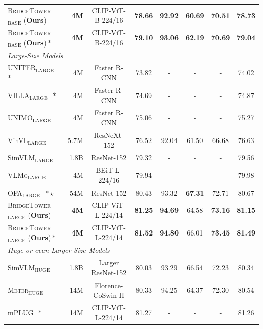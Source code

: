 \documentclass[letterpaper]{article} %
\newcommand{\methodname}[0]{\textsc{BridgeTower}}
\newcommand{\modelbase}[0]{$_{\text{BASE}}$}
\newcommand{\modellarge}[0]{$_{\text{LARGE}}$}
\newcommand{\modelhuge}[0]{$_{\text{HUGE}}$}
\newcommand{\metername}[0]{\textsc{Meter}}
\newcommand{\vlmoname}[0]{\textsc{VLMo}}
\begin{document}
\begin{table}[ht]
{\begin{tabular}{lrc|ccccc}
      \methodname{}\modelbase{} (\textbf{Ours})  & \textbf{4M} & CLIP-ViT-B-224/16 & \textbf{78.66} & \textbf{92.92} & \textbf{60.69} & \textbf{70.51} & \textbf{78.73} \\
      \methodname{}\modelbase{} (\textbf{Ours})\,$\ast$  & \textbf{4M} & CLIP-ViT-B-224/16 & \textbf{79.10} & \textbf{93.06} & \textbf{62.19} & \textbf{70.69} & \textbf{79.04} \\
      \hline
      \multicolumn{7}{l}{ { \it{Large-Size Models} } }\\
      \hline
      UNITER\modellarge{}~\citep{chen2020uniter}\,$\ast$ & 4M & Faster R-CNN & 73.82 & - & - & - & 74.02   \\
      VILLA\modellarge{}~\citep{gan2020large}\,$\ast$ & 4M & Faster R-CNN & 74.69 & - & - & - & 74.87 \\
      UNIMO\modellarge{}~\citep{li2021unimo} & 4M & Faster R-CNN & 75.06 & - & - & - & 75.27  \\
      VinVL\modellarge{}~\citep{zhang2021vinvl} & 5.7M & ResNeXt-152 & {76.52} & 92.04 & 61.50 & 66.68 & 76.63 \\
      {SimVLM\modellarge{}~\citep{wang2021simvlm}} & 1.8B & ResNet-152 & 79.32 & - & - & - & 79.56 \\
      \vlmoname{}\modellarge{}~\citep{wang2021vlmo} & 4M & BEiT-L-224/16 & 79.94 & - & - & - & 79.98 \\
      OFA\modellarge{}~\citep{wang2022OFA}\,$\ast$\,$\star$ & 54M & ResNet-152 & 80.43 & 93.32 & \textbf{67.31} & 72.71 & 80.67 \\
      \methodname{}\modellarge{} (\textbf{Ours})  & \textbf{4M} & CLIP-ViT-L-224/14 & \textbf{81.25}  & \textbf{94.69} & {64.58} & \textbf{73.16} & \textbf{81.15} \\
      \methodname{}\modellarge{} (\textbf{Ours})\,$\ast$  & \textbf{4M} & CLIP-ViT-L-224/14 & \textbf{81.52}  & \textbf{94.80} & {66.01} & \textbf{73.45} & \textbf{81.49} \\
      \hline
    \multicolumn{7}{l}{\it{Huge or even Larger Size Models}}\\
    \hline
      {SimVLM\modelhuge{}~\citep{wang2021simvlm}} & 1.8B & Larger ResNet-152 & {80.03} & 93.29 & 66.54 & 72.23 & {80.34} \\
      \metername{}\modelhuge{}~\citep{dou2021meter} & 14M & Florence-CoSwin-H & 80.33 & 94.25 & 64.37 & 72.30 & 80.54 \\
      mPLUG~\citep{li2022mplug}\,$\ast$ & 14M & CLIP-ViT-L-224/14 & 81.27 & - & - & - & 81.26 \\

\end{tabular}}
\end{table}
\end{document}
